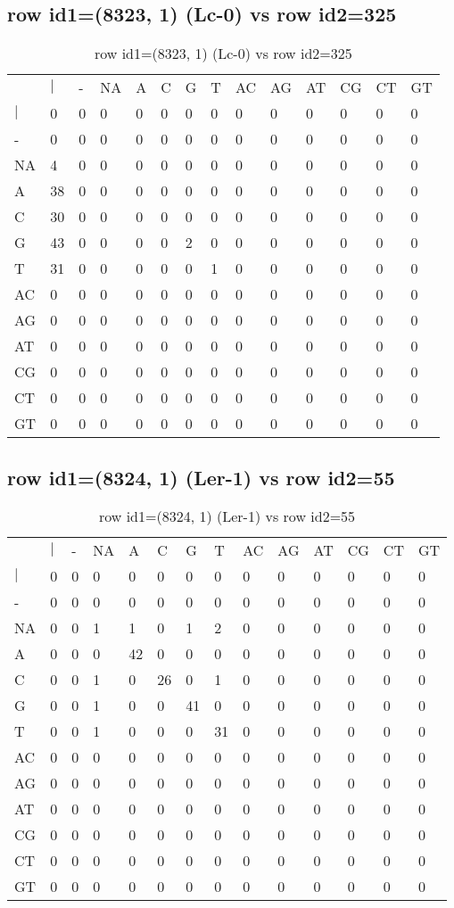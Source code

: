 \subsection{row id1=(8323, 1) (Lc-0) vs row id2=325}
\begin{center}
\begin{longtable}{|l|l|l|l|l|l|l|l|l|l|l|l|l|l|}
\caption{row id1=(8323, 1) (Lc-0) vs row id2=325} \label{table_dm318}\\
\hline
\\
\hline
&$|$&-&NA&A&C&G&T&AC&AG&AT&CG&CT&GT\\
$|$&0&0&0&0&0&0&0&0&0&0&0&0&0\\
-&0&0&0&0&0&0&0&0&0&0&0&0&0\\
NA&4&0&0&0&0&0&0&0&0&0&0&0&0\\
A&38&0&0&0&0&0&0&0&0&0&0&0&0\\
C&30&0&0&0&0&0&0&0&0&0&0&0&0\\
G&43&0&0&0&0&2&0&0&0&0&0&0&0\\
T&31&0&0&0&0&0&1&0&0&0&0&0&0\\
AC&0&0&0&0&0&0&0&0&0&0&0&0&0\\
AG&0&0&0&0&0&0&0&0&0&0&0&0&0\\
AT&0&0&0&0&0&0&0&0&0&0&0&0&0\\
CG&0&0&0&0&0&0&0&0&0&0&0&0&0\\
CT&0&0&0&0&0&0&0&0&0&0&0&0&0\\
GT&0&0&0&0&0&0&0&0&0&0&0&0&0\\
\hline
\end{longtable}
\end{center}

\subsection{row id1=(8324, 1) (Ler-1) vs row id2=55}
\begin{center}
\begin{longtable}{|l|l|l|l|l|l|l|l|l|l|l|l|l|l|}
\caption{row id1=(8324, 1) (Ler-1) vs row id2=55} \label{table_dm320}\\
\hline
\\
\hline
&$|$&-&NA&A&C&G&T&AC&AG&AT&CG&CT&GT\\
$|$&0&0&0&0&0&0&0&0&0&0&0&0&0\\
-&0&0&0&0&0&0&0&0&0&0&0&0&0\\
NA&0&0&1&1&0&1&2&0&0&0&0&0&0\\
A&0&0&0&42&0&0&0&0&0&0&0&0&0\\
C&0&0&1&0&26&0&1&0&0&0&0&0&0\\
G&0&0&1&0&0&41&0&0&0&0&0&0&0\\
T&0&0&1&0&0&0&31&0&0&0&0&0&0\\
AC&0&0&0&0&0&0&0&0&0&0&0&0&0\\
AG&0&0&0&0&0&0&0&0&0&0&0&0&0\\
AT&0&0&0&0&0&0&0&0&0&0&0&0&0\\
CG&0&0&0&0&0&0&0&0&0&0&0&0&0\\
CT&0&0&0&0&0&0&0&0&0&0&0&0&0\\
GT&0&0&0&0&0&0&0&0&0&0&0&0&0\\
\hline
\end{longtable}
\end{center}

